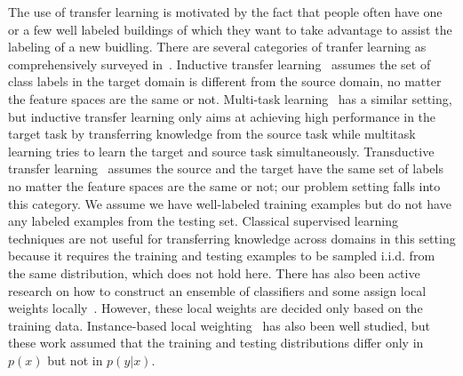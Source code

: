 The use of transfer learning is motivated by the fact that people often have one or a few well labeled buildings of which they want to take advantage to assist the labeling of a new buidling.
There are several categories of tranfer learning as comprehensively surveyed in~\cite{transfer1}. 
Inductive transfer learning~\cite{transfer2} assumes the set of class labels in the target domain is different from the source domain, no matter the feature spaces are the same or not. 
Multi-task learning~\cite{multitask} has a similar setting, but inductive transfer learning only aims at achieving high performance in the target task by transferring knowledge from the source task while multitask learning tries to learn the target and source task simultaneously. 
Transductive transfer learning~\cite{transfer3} assumes the source and the target have the same set of labels no matter the feature spaces are the same or not; our problem setting falls into this category. 
We assume we have well-labeled training examples but do not have any labeled examples from the testing set.
Classical supervised learning techniques are not useful for transferring knowledge across domains in this setting because it requires the training and testing examples to be sampled i.i.d. from the same distribution, which does not hold here.
There has also been active research on how to construct an ensemble of classifiers and some assign local weights
locally~\cite{ensem1,ensem2}. However, these local weights are decided only based on the training data.
Instance-based local weighting~\cite{weight1,weight2,weight3} has also been well studied, but these work assumed that the training and testing distributions differ only in $p(x)$ but not in $p(y|x)$.


